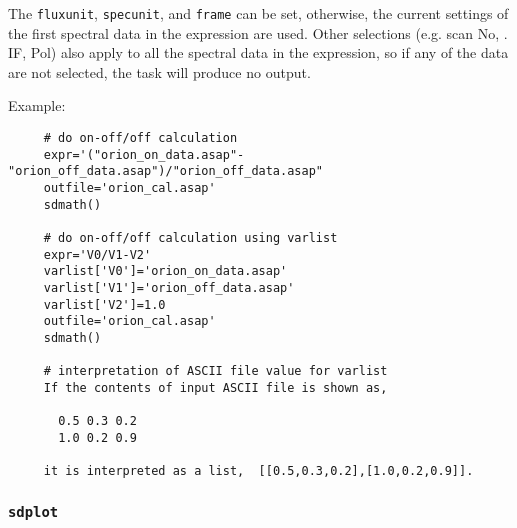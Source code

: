      The {\tt fluxunit}, {\tt specunit}, and {\tt frame} can be set, otherwise, the current
     settings of the first spectral data in the expression are used.  
     Other selections (e.g. scan No, . IF, Pol) also apply to all 
     the spectral data in the expression, so if any of the data are
     not selected, the task will produce no output. 
     
     Example:
\begin{verbatim}
     # do on-off/off calculation
     expr='("orion_on_data.asap"-"orion_off_data.asap")/"orion_off_data.asap"
     outfile='orion_cal.asap'
     sdmath()
     
     # do on-off/off calculation using varlist
     expr='V0/V1-V2'
     varlist['V0']='orion_on_data.asap'
     varlist['V1']='orion_off_data.asap'
     varlist['V2']=1.0
     outfile='orion_cal.asap'
     sdmath()
     
     # interpretation of ASCII file value for varlist
     If the contents of input ASCII file is shown as,

       0.5 0.3 0.2
       1.0 0.2 0.9

     it is interpreted as a list,  [[0.5,0.3,0.2],[1.0,0.2,0.9]].
\end{verbatim}


\subsubsection{{\tt sdplot}}
\label{section:sd.sdtasks.tasks.sdplot}

